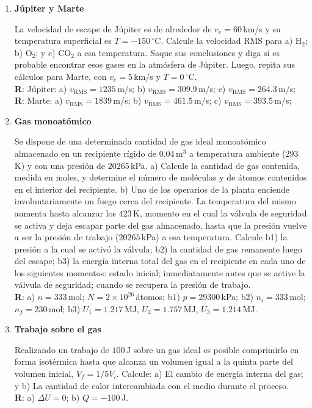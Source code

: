\documentclass[a4paper,12pt]{article}
\begin{document}
\begin{enumerate}
	\item {\bf{Júpiter y Marte}}

		La velocidad de escape de Júpiter es de alrededor de $v_e=60$\,km/s y
		su temperatura superficial es $T=-150\,^\circ$C. Calcule la velocidad
		RMS para a) H$_2$; b) O$_2$; y c) CO$_2$ a esa temperatura. Saque sus
		conclusiones y diga si es probable encontrar esos gases en la atmósfera
		de Júpiter. Luego, repita sus cálculos para Marte, con $v_e=5$\,km/s y
		$T=0\,^\circ$C.
		\\{\bf R}: Júpiter: a) $v_{\mathrm{RMS}}=1235$\,m/s; b)
		$v_{\mathrm{RMS}}=309.9$\,m/s; c) $v_{\mathrm{RMS}}=264.3$\,m/s;
		\\{\bf R}: Marte: a) $v_{\mathrm{RMS}}=1839$\,m/s; b)
		$v_{\mathrm{RMS}}=461.5$\,m/s; c) $v_{\mathrm{RMS}}=393.5$\,m/s;
	
	\item {\bf{Gas monoatómico}}
	
		Se dispone de una determinada cantidad de gas ideal monoatómico
		almacenado en un recipiente rígido de $0.04$\,m$^3$ a temperatura
		ambiente ($293$\,K) y con una presión de $20265$\,kPa. a) Calcule la
		cantidad de gas contenida, medida en moles, y determine el número de
		moléculas y de átomos contenidos en el interior del recipiente. b) Uno
		de los operarios de la planta enciende involuntariamente un fuego cerca
		del recipiente. La temperatura del mismo aumenta hasta alcanzar los
		$423$\,K, momento en el cual la válvula de seguridad se activa y deja
		escapar parte del gas almacenado, hasta que la presión vuelve a ser la
		presión de trabajo ($20265$\,kPa) a esa temperatura. Calcule b1) la
		presión a la cual se activó la válvula; b2) la cantidad de gas
		remanente luego del escape; b3) la energía interna total del gas en el
		recipiente en cada uno de los siguientes momentos: estado inicial;
		inmediatamente antes que se active la válvula de seguridad; cuando se
		recupera la presión de trabajo.
		\\{\bf R}: a) $n=333$\,mol; $N=2\times10^{26}$\,átomos; b1)
		$p=29300$\,kPa; b2) $n_i=333$\,mol; $n_f=230$\,mol; b3)
		$U_1=1.217$\,MJ, $U_2=1.757$\,MJ, $U_3=1.214$\,MJ.

	\item {\bf{Trabajo sobre el gas}}

		Realizando un trabajo de $100$\,J sobre un gas ideal es posible
		comprimirlo en forma isotérmica hasta que alcanza un volumen igual a la
		quinta parte del volumen inicial, $V_f = 1/5 V_i$. Calcule: a) El
		cambio de energía interna del gas; y b) La cantidad de calor
		intercambiada con el medio durante el proceso. 
		\\{\bf R}: a) $\Delta U = 0$; b) $Q=-100$\,J.
	

\end{enumerate}
\end{document}
